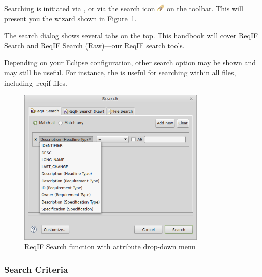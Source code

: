 {{{Searching is initiated via , or via the search icon \includegraphics[height=1em]{../rmf-images/icons/full/obj16/search.png} on the toolbar.  This will present you the wizard shown in Figure~\ref{fig:reqif_search}.

\begin{info}
The search dialog shows several tabs on the top.  This handbook will cover ReqIF Search and ReqIF Search (Raw)---our ReqIF search tools.  

Depending on your Eclipse configuration, other search option may be shown and may still be useful.  For instance, the  is useful for searching within all files, including .reqif files.
\end{info}

\begin{figure}[H]
  \centering
  \includegraphics[width=0.8\textwidth]{../rmf-images/reqIF_search_1.png}
  \caption{ReqIF Search function with attribute drop-down menu}
  \label{fig:reqif_search}
\end{figure}
\label{sec:reqif_search}

\subsubsection{Search Criteria}

}}}
